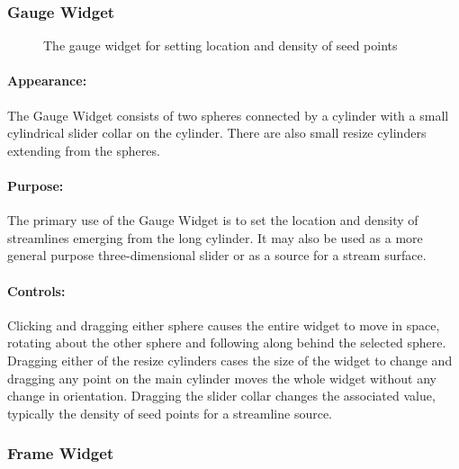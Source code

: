 \subsubsection{Gauge Widget}
\label{sec:view-gaugewidget} 

\begin{figure}[htb]
  \begin{makeimage}
  \end{makeimage}
  \gaugewidget
  \caption{\label{fig:boxwidget} The gauge widget for setting location and
    density of seed points}
\end{figure}

\paragraph{Appearance: } The Gauge Widget consists of two spheres connected
by a cylinder with a small cylindrical slider collar on the cylinder.
There are also small resize cylinders extending from the spheres.

\paragraph{Purpose:} The primary use of the Gauge Widget is to set the
location and density of streamlines emerging from the long cylinder.  It
may also be used as a more general purpose three-dimensional slider or as a
source for a stream surface. 

\paragraph{Controls: } Clicking and dragging either sphere causes the
entire widget to move in space, rotating about the other sphere and
following along behind the selected sphere.  Dragging either of the resize
cylinders cases the size of the widget to change and dragging any point on
the main cylinder moves the whole widget without any change in orientation.
Dragging the slider collar changes the associated value, typically the
density of seed points for a streamline source.

\subsubsection{Frame Widget}
\label{sec:view-framewidget} 

